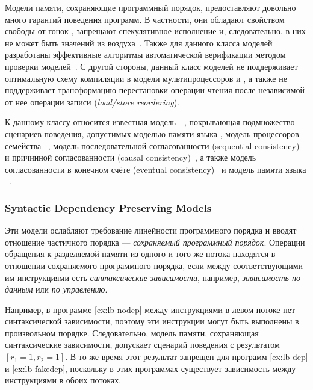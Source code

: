 Модели памяти, сохраняющие программный порядок, 
предоставляют довольно много гарантий  поведения программ. 
В частности, они обладают свойством свободы от гонок \DRF, 
запрещают спекулятивное исполнение и, следовательно, 
в них не может быть значений из воздуха~\cite{Lahav-al:PLDI17}. 
Также для данного класса моделей разработаны эффективные 
алгоритмы автоматической верификации 
методом проверки моделей~\cite{Kokologiannakis-al:POPL2017, Kokologiannakis:PLDI2019}.
С другой стороны, данный класс моделей не поддерживает
оптимальную схему компиляции в модели мультипроцессоров
\ARM и \POWER, а также не поддерживает трансформацию 
перестановки операции чтения после независимой
от нее операции записи (\emph{load/store reordering}). 

К данному классу относится известная  модель~\RCMM~\cite{Lahav-al:PLDI17}, 
покрывающая подмножество сценариев поведения, допустимых моделью памяти языка \CLANG,
модель \TSO процессоров семейства \Intel~\cite{Sewell-al:CACM10},
модель последовательной согласованности (sequential consistency)~\cite{Lamport:TC79} и
причинной согласованности (causal consistency)~\autocite{Lahav-Boker:PLDI2020}, а также
модель  согласованности в конечном счёте (eventual consistency)~\cite{Jagadeesan-al:ESOP2018} и
 модель памяти языка \OCaml~\cite{Dolan-al:PLDI18}.

\subsubsection*{Syntactic Dependency Preserving Models}

Эти модели ослабляют требование линейности программного порядка 
и вводят отношение частичного порядка --- \emph{сохраняемый программный порядок}. 
Операции обращения к разделяемой памяти из одного и того же потока
находятся в отношении сохраняемого программного порядка, 
если между соответствующими им инструкциями есть 
\emph{синтаксические зависимости}, например, 
\emph{зависимость по данным} или \emph{по управлению}. 

Например, в программе \ref{ex:lb-nodep} между инструкциями в 
левом потоке нет синтаксической зависимости, 
поэтому эти инструкции могут быть выполнены в произвольном порядке. 
Следовательно, модель памяти, сохраняющая синтаксические зависимости, 
допускает сценарий поведения с результатом ${[r_1=1,r_2=1]}$. 
В то же время этот результат запрещен для программ 
\ref{ex:lb-dep} и \ref{ex:lb-fakedep}, 
поскольку в этих программах существует зависимость 
между инструкциями в обоих потоках. 


